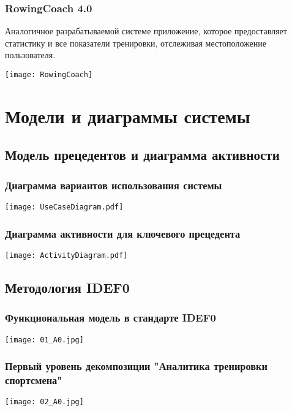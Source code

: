 \documentclass[10pt,utf8,presentation,notheorems,xcolor=dvipsnames,compress]{beamer}
\begin{document}
\begin{frame}
\frametitle{RowingCoach 4.0}
Аналогичное разрабатываемой системе приложение, которое предоставляет статистику и все показатели тренировки, отслеживая местоположение пользователя.
\begin{center}
\texttt{[image: RowingCoach]}%
\end{center}
\end{frame}

\section{Модели и диаграммы системы}

\subsection{Модель прецедентов и диаграмма активности}

\begin{frame}
\frametitle{Диаграмма вариантов использования системы}
\begin{center}
\texttt{[image: UseCaseDiagram.pdf]}%
\end{center}
\end{frame}

\begin{frame}
\frametitle{Диаграмма активности для ключевого прецедента}
\begin{center}
\texttt{[image: ActivityDiagram.pdf]}%
\end{center}
\end{frame}

\subsection{Методология IDEF0}

\begin{frame}
\frametitle{Функциональная модель в стандарте IDEF0}
\begin{center}
\texttt{[image: 01\_A0.jpg]}%
\end{center}
\end{frame}

\begin{frame}
\frametitle{Первый уровень декомпозиции "Аналитика тренировки спортсмена"}
\begin{center}
\texttt{[image: 02\_A0.jpg]}%
\end{center}
\end{frame}
\end{document}
